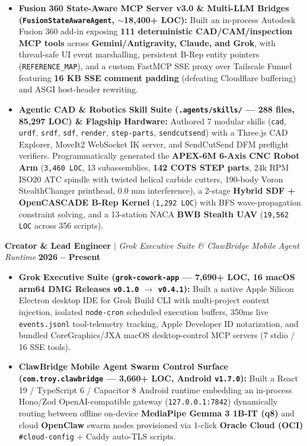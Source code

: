 \documentclass[10pt,letterpaper]{article}
\begin{document}
\begin{itemize}
    \item \textbf{Fusion 360 State-Aware MCP Server v3.0 \& Multi-LLM Bridges (\texttt{FusionStateAwareAgent}, $\sim$18,400+ LOC):} Built an in-process Autodesk Fusion 360 add-in exposing \textbf{111 deterministic CAD/CAM/inspection MCP tools} across \textbf{Gemini/Antigravity, Claude, and Grok}, with thread-safe UI event marshalling, persistent B-Rep entity pointers (\texttt{REFERENCE\_MAP}), and a custom FastMCP SSE proxy over Tailscale Funnel featuring \textbf{16 KB SSE comment padding} (defeating Cloudflare buffering) and ASGI host-header rewriting.
    \item \textbf{Agentic CAD \& Robotics Skill Suite (\texttt{.agents/skills/} --- 288 files, 85,297 LOC) \& Flagship Hardware:} Authored 7 modular skills (\texttt{cad}, \texttt{urdf}, \texttt{srdf}, \texttt{sdf}, \texttt{render}, \texttt{step-parts}, \texttt{sendcutsend}) with a Three.js CAD Explorer, MoveIt2 WebSocket IK server, and SendCutSend DFM preflight verifiers. Programmatically generated the \textbf{APEX-6M 6-Axis CNC Robot Arm} (\texttt{3,460 LOC}, 13 subassemblies, \textbf{142 COTS STEP parts}, 24k RPM ISO20 ATC spindle with twisted helical carbide cutters, 190-body Voron StealthChanger printhead, $0.0\text{ mm}$ interference), a 2-stage \textbf{Hybrid SDF + OpenCASCADE B-Rep Kernel} (\texttt{1,292 LOC}) with BFS wave-propagation constraint solving, and a 13-station NACA \textbf{BWB Stealth UAV} (\texttt{19,562 LOC} across 356 scripts).
\end{itemize}

\textbf{Creator \& Lead Engineer} $|$ \textit{Grok Executive Suite \& ClawBridge Mobile Agent Runtime} \hfill \textbf{2026 -- Present}
\begin{itemize}
    \item \textbf{Grok Executive Suite (\texttt{grok-cowork-app} --- 7,690+ LOC, 16 macOS arm64 DMG Releases \texttt{v0.1.0} $\rightarrow$ \texttt{v0.4.1}):} Built a native Apple Silicon Electron desktop IDE for Grok Build CLI with multi-project context injection, isolated \texttt{node-cron} scheduled execution buffers, 350ms live \texttt{events.jsonl} tool-telemetry tracking, Apple Developer ID notarization, and bundled CoreGraphics/JXA macOS desktop-control MCP servers (7 stdio / 16 SSE tools).
    \item \textbf{ClawBridge Mobile Agent Swarm Control Surface (\texttt{com.troy.clawbridge} --- 3,660+ LOC, Android \texttt{v1.7.0}):} Built a React 19 / TypeScript 6 / Capacitor 8 Android runtime embedding an in-process Hono/Zod OpenAI-compatible gateway (\texttt{127.0.0.1:7842}) dynamically routing between offline on-device \textbf{MediaPipe Gemma 3 1B-IT (q8)} and cloud \textbf{OpenClaw} swarm nodes provisioned via 1-click \textbf{Oracle Cloud (OCI)} \texttt{\#cloud-config} + Caddy auto-TLS scripts.
\end{itemize}
\end{document}
